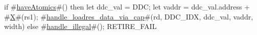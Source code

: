 if #\hyperref[sailRISCVzhaveAtomics]{haveAtomics}#() then {
  let ddc_val = DDC;
  let vaddr = ddc_val.address + #\hyperref[sailRISCVzX]{X}#(rs1);
  #\hyperref[sailRISCVzhandlezyloadreszydatazyviazycap]{handle\_loadres\_data\_via\_cap}#(rd, DDC_IDX, ddc_val, vaddr, width)
} else {
  #\hyperref[sailRISCVzhandlezyillegal]{handle\_illegal}#();
  RETIRE_FAIL
}
